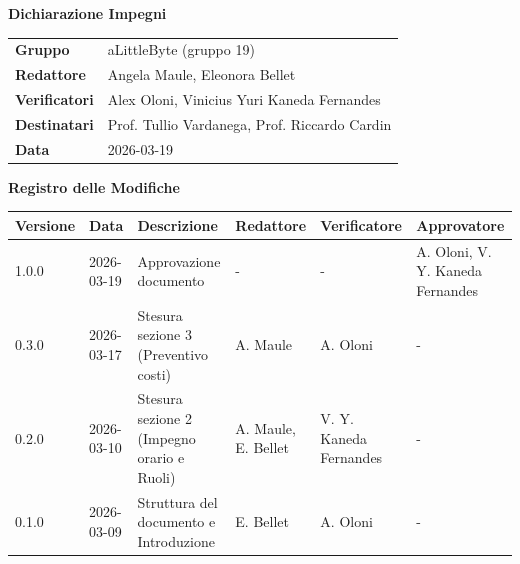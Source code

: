 \documentclass[a4paper,12pt]{article}
\begin{document}
\thispagestyle{firstpage}

\vspace*{0.5cm}

\begin{center}
    {\LARGE \textbf{Dichiarazione Impegni}}
\end{center}

\vspace{1.5cm}

\begin{center}
    \renewcommand{\arraystretch}{1.3}
    \begin{tcolorbox}[
        width=0.92\textwidth,
        colback=gray!6,
        colframe=gray!45,
        boxrule=0.5pt,
        arc=2mm,
        boxsep=0pt,
        left=8pt, right=8pt, top=8pt, bottom=8pt
    ]
        \begin{tabularx}{\linewidth}{>{\bfseries}p{3.5cm} X}
            Gruppo      & aLittleByte (gruppo 19) \\
            Redattore   & Angela Maule, Eleonora Bellet \\
            Verificatori & Alex Oloni, Vinicius Yuri Kaneda Fernandes \\
            Destinatari & Prof. Tullio Vardanega, Prof. Riccardo Cardin \\
            Data        & 2026-03-19
        \end{tabularx}
    \end{tcolorbox}
\end{center}

\newpage
{}

\begin{center}
    {\Large \textbf{Registro delle Modifiche}}
\end{center}

\vspace{0.35cm}

\renewcommand{\arraystretch}{1.35}
\begin{center}
    {\footnotesize
    \begin{tabularx}{\textwidth}{|l|l|X|p{2cm}|p{2cm}|p{2cm}|}
        \hline
        \rowcolor{gray!20}
        \textbf{Versione} & \textbf{Data} & \textbf{Descrizione} & \textbf{Redattore} & \textbf{Verificatore} & \textbf{Approvatore} \\
         \hline 
        1.0.0 & 2026-03-19 & Approvazione documento & - & - & A. Oloni, V. Y. Kaneda Fernandes\\
        \hline 
        0.3.0 & 2026-03-17 & Stesura sezione 3 (Preventivo costi) & A. Maule & A. Oloni & - \\
        \hline 
        0.2.0 & 2026-03-10 & Stesura sezione 2 (Impegno orario e Ruoli) & A. Maule, E. Bellet & V. Y. Kaneda Fernandes & - \\
        \hline
        0.1.0 & 2026-03-09 & Struttura del documento e Introduzione & E. Bellet & A. Oloni & - \\
        \hline 
    \end{tabularx}
    }
\end{center}
\end{document}
